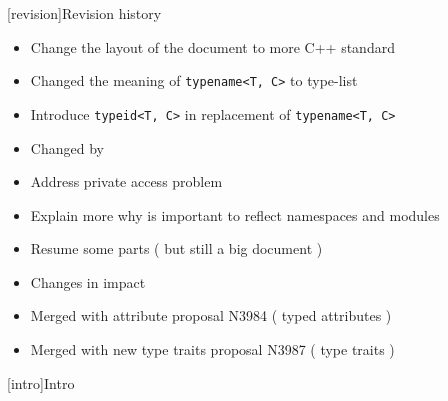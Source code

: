 [revision]{Revision history}
\begin{itemize}
\item Change the layout of the document to more C++ standard
\item Changed the meaning of \texttt{typename<T, C>} to type-list
\item Introduce \texttt{typeid<T, C>} in replacement of \texttt{typename<T, C>}
\item Changed  by \tcode{,}
\item Address private access problem
\item Explain more why is important to reflect namespaces and modules
\item Resume some parts ( but still a big document )
\item Changes in impact
\item Merged with attribute proposal N3984 ( typed attributes )
\item Merged with new type traits proposal N3987 ( type traits )
\end{itemize}
[intro]{Intro}
